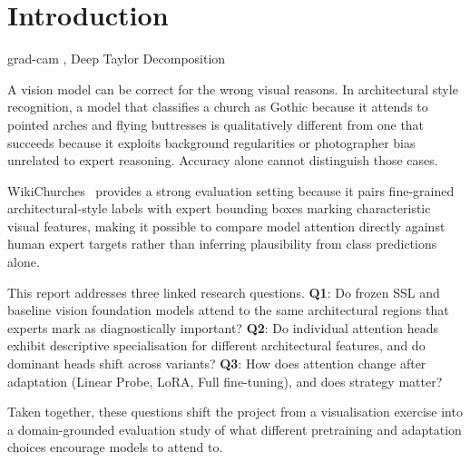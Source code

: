 \documentclass[lineno,pdflatex,sn-mathphys-num]{sn-jnl}%
\theoremstyle{thmstyleone}%
\theoremstyle{thmstyletwo}%
\theoremstyle{thmstylethree}%
\begin{document}


\maketitle

\clearpage

\section{Introduction}

\cite{Hasic26NN, Remi25IF, Wan26PAMI, Kashefi2026review}

grad-cam \cite{Selvaraju17GradCAM}, Deep Taylor Decomposition \cite{Chefer21Interp}

A vision model can be correct for the wrong visual reasons. In architectural
style recognition, a model that classifies a church as Gothic because it attends
to pointed arches and flying buttresses is qualitatively different from one that
succeeds because it exploits background regularities or photographer bias
unrelated to expert reasoning. Accuracy alone cannot distinguish those cases.

WikiChurches~\cite{Barz21WikiChurches} provides a strong evaluation setting
because it pairs fine-grained architectural-style labels with expert bounding
boxes marking characteristic visual features, making it possible to compare
model attention directly against human expert targets rather than inferring
plausibility from class predictions alone.

This report addresses three linked research questions. \textbf{Q1}: Do frozen
SSL and baseline vision foundation models attend to the same architectural regions that
experts mark as diagnostically important?  \textbf{Q2}: Do individual attention heads exhibit descriptive specialisation for different architectural features, and do dominant heads shift
across variants? \textbf{Q3}: How does attention change
after adaptation (Linear Probe, LoRA, Full fine-tuning), and does strategy
matter?

Taken together, these questions shift the project from a visualisation exercise
into a domain-grounded evaluation study of what different pretraining and
adaptation choices encourage models to attend to.
\end{document}

